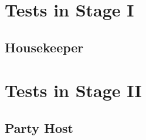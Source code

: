 \documentclass[11pt, twoside, openright, a4paper, chapterprefix]{scrbook}
\begin{document}


\pagestyle{empty}

\clearpage

\pagestyle{empty}
\setcounter{tocdepth}{1}
\tableofcontents
\clearpage

\pagestyle{plain}











\chapter{Tests in Stage I}
\label{chap:stage_I}

\section*{Housekeeper}



\newpage

\newpage






\chapter{Tests in Stage II}
\label{chap:stage_II}

\section*{Party Host}



\newpage

\newpage

\printabx
\printidx
\end{document}

